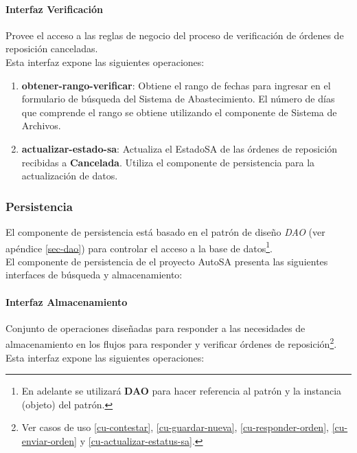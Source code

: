 \paragraph{Interfaz Verificación\\}
Provee el acceso a las reglas de negocio del proceso de verificación de órdenes de reposición canceladas.\\
Esta interfaz expone las siguientes operaciones:

\begin{enumerate}
	\item \textbf{obtener-rango-verificar}: Obtiene el rango de fechas para ingresar en el formulario de búsqueda del Sistema de Abastecimiento. El número de días que comprende el rango se obtiene utilizando el componente de Sistema de Archivos.
	\item \textbf{actualizar-estado-sa}: Actualiza el EstadoSA de las órdenes de reposición recibidas a \textbf{Cancelada}. Utiliza el componente de persistencia para la actualización de datos.
\end{enumerate}

\subsubsection{Persistencia}
El componente de persistencia está basado en el patrón de diseño \textit{DAO} (ver apéndice \ref{sec-dao}) para controlar el acceso a la base de datos\footnote{En adelante se utilizará \textbf{DAO} para hacer referencia al patrón y la instancia (objeto) del patrón.}.\\
El componente de persistencia de el proyecto AutoSA presenta las siguientes interfaces de búsqueda y almacenamiento:
\paragraph{Interfaz Almacenamiento\\}
Conjunto de operaciones diseñadas para responder a las necesidades de almacenamiento en los flujos para responder y verificar órdenes de reposición\footnote{Ver casos de uso \ref{cu-contestar}, \ref{cu-guardar-nueva}, \ref{cu-responder-orden}, \ref{cu-enviar-orden} y \ref{cu-actualizar-estatus-sa}.}.\\
Esta interfaz expone las siguientes operaciones:

